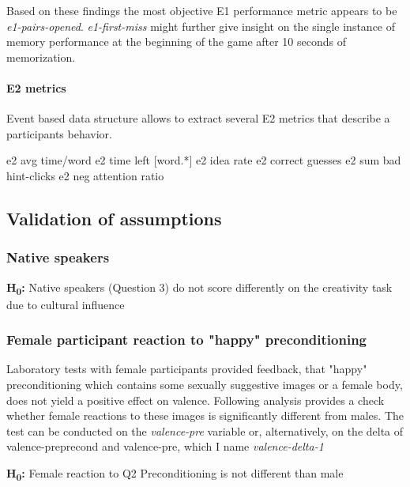 	Based on these findings the most objective E1 performance metric appears to be \textit{e1-pairs-opened}.
	\textit{e1-first-miss} might further give insight on the single instance of memory performance at the beginning of the game after 10 seconds of memorization.
	
	\paragraph{E2 metrics} 
	Event based data structure allows to extract several E2 metrics that describe a participants behavior.
	
	e2 avg time/word 
	 e2 time left [word.*]  
	  e2 idea rate 
	   e2 correct guesses
	e2 sum bad hint-clicks 
	 e2 neg attention ratio
	
	
	
	
	\subsection{Validation of assumptions} \label{sec:data-validity}
	
		\subsubsection{Native speakers} 
		\textbf{H\textsubscript{0}:}  Native speakers (Question 3) do not score differently on the creativity task due to cultural influence 
		
		
		\subsubsection{Female participant reaction to "happy" preconditioning}
		
		Laboratory tests with female participants provided feedback, that "happy" preconditioning which contains some sexually suggestive images or a female body, does not yield a positive effect on valence. Following analysis provides a check whether female reactions to these images is significantly different from males. The test can be conducted on the \textit{valence-pre} variable or, alternatively, on the delta of valence-preprecond and valence-pre, which I name \textit{valence-delta-1}
		 
		\textbf{H\textsubscript{0}:} Female reaction to Q2 Preconditioning is not different than male
		
		
